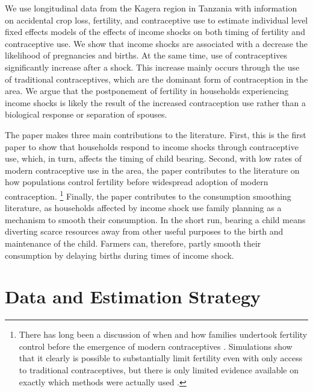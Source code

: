 \documentclass[letterpaper,12pt]{article}
\begin{document}
We use longitudinal data from the Kagera region in Tanzania with information on 
accidental crop loss, fertility, and contraceptive use to estimate individual 
level fixed effects models of the effects of income shocks on both timing of 
fertility and contraceptive use.
We show that income shocks are associated with a decrease the likelihood of 
pregnancies and births.
At the same time, use of contraceptives significantly increase after a shock.
This increase mainly occurs through the use of traditional contraceptives, 
which are the dominant form of contraception in the area.
We argue that the postponement of fertility in households experiencing income 
shocks is likely the result of the increased contraception use rather than a 
biological response or separation of spouses.

The paper makes three main contributions to the literature. 
First, this is the first paper to show that households respond to income shocks 
through contraceptive use, which, in turn, affects the timing of child bearing. 
Second, with low rates of modern contraceptive use in the area, the paper contributes 
to the literature on how populations control fertility before widespread adoption of
modern contraception.%
\footnote{
There has long been a discussion of when and how families 
undertook fertility control before the emergence of modern 
contraceptives \citep{Guinnane2011,Cinnirella2017}.
Simulations show that it clearly is possible to substantially limit fertility
even with only access to traditional contraceptives, but there is only 
limited evidence available on exactly which methods were actually used 
\citep{Michael1976,David1986,Santow1995}.
}
Finally, the paper contributes to the consumption smoothing literature, as households 
affected by income shock use family planning as a mechanism to smooth their consumption. 
In the short run, bearing a child means diverting scarce resources away from other
useful purposes to the birth and maintenance of the child. 
Farmers can, therefore, partly smooth their consumption by delaying births during 
times of income shock.



\section{Data and Estimation Strategy}
\end{document}
